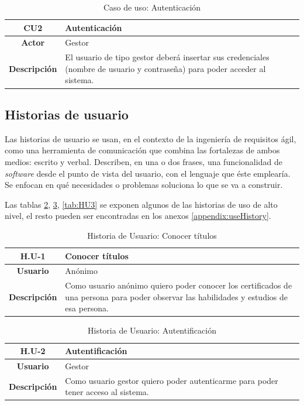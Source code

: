 \begin{table}[!h]
	\begin{center}
		\begin{tabular}{|c|p{10cm}|}
			\hline \textbf{CU2} & Autenticación \\ 
			\hline \textbf{Actor} & Gestor\\ 
			\hline \textbf{Descripción} & El usuario de tipo gestor deberá insertar sus credenciales (nombre de usuario y contraseña) para poder acceder al sistema.\\ 
			\hline 
		\end{tabular}
		\caption{Caso de uso: Autenticación}
		\label{tab:CU2}
	\end{center}
\end{table}

\subsection{Historias de usuario}
Las historias de usuario se usan, en el contexto de la ingeniería de requisitos ágil, como una herramienta de comunicación que combina las fortalezas de ambos medios: escrito y verbal. Describen, en una o dos frases, una funcionalidad de \textit{software} desde el punto de vista del usuario, con el lenguaje que éste emplearía. Se enfocan en qué necesidades o problemas soluciona lo que se va a construir.

Las tablas \ref{tab:HU1}, \ref{tab:HU2}, \ref{tab:HU3} se exponen algunos de las historias de uso de alto nivel, el resto pueden ser encontradas en los anexos \ref{appendix:useHistory}.

\begin{table}[!h]
	\begin{center}
		\begin{tabular}{|c|p{10cm}|}
			\hline \textbf{H.U-1} & Conocer títulos \\ 
			\hline \textbf{Usuario} & Anónimo\\ 
			\hline \textbf{Descripción} & Como usuario anónimo quiero poder conocer los certificados de una persona para poder observar las habilidades y estudios de esa persona. \\ 
			\hline 
		\end{tabular}
		\caption{Historia de Usuario: Conocer títulos}
		\label{tab:HU1}
	\end{center}
\end{table}

\begin{table}[!h]
	\begin{center}
		\begin{tabular}{|c|p{10cm}|}
			\hline \textbf{H.U-2} & Autentificación \\ 
			\hline \textbf{Usuario} & Gestor \\ 
			\hline \textbf{Descripción} & Como usuario gestor quiero poder autenticarme para poder tener acceso al sistema. \\ 
			\hline 
		\end{tabular}
		\caption{Historia de Usuario: Autentificación}
		\label{tab:HU2}
	\end{center}
\end{table}

